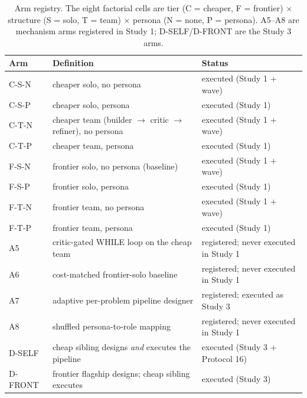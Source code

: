 \documentclass[12pt,a4paper]{article}
\begin{document}
\begin{table}[ht]
  \centering
  \caption{Arm registry. The eight factorial cells are tier (C = cheaper,
  F = frontier) $\times$ structure (S = solo, T = team) $\times$ persona
  (N = none, P = persona). A5--A8 are mechanism arms registered in Study 1;
  D-SELF/D-FRONT are the Study 3 arms.}
  \label{tab:arm-registry}
  \footnotesize
  \begin{tabular}{@{}l l l@{}}
    \toprule
    \textbf{Arm} & \textbf{Definition} & \textbf{Status} \\
    \midrule
    C-S-N & cheaper solo, no persona & executed (Study 1 + wave) \\
    C-S-P & cheaper solo, persona & executed (Study 1) \\
    C-T-N & cheaper team (builder $\to$ critic $\to$ refiner), no persona & executed (Study 1 + wave) \\
    C-T-P & cheaper team, persona & executed (Study 1) \\
    F-S-N & frontier solo, no persona (baseline) & executed (Study 1 + wave) \\
    F-S-P & frontier solo, persona & executed (Study 1) \\
    F-T-N & frontier team, no persona & executed (Study 1 + wave) \\
    F-T-P & frontier team, persona & executed (Study 1) \\
    \midrule
    A5 & critic-gated WHILE loop on the cheap team & registered; never executed in Study 1 \\
    A6 & cost-matched frontier-solo baseline & registered; never executed in Study 1 \\
    A7 & adaptive per-problem pipeline designer & registered; executed as Study 3 \\
    A8 & shuffled persona-to-role mapping & registered; never executed in Study 1 \\
    \midrule
    D-SELF & cheap sibling designs \emph{and} executes the pipeline & executed (Study 3 + Protocol 16) \\
    D-FRONT & frontier flagship designs; cheap sibling executes & executed (Study 3) \\
    \bottomrule
  \end{tabular}
\end{table}
\end{document}
